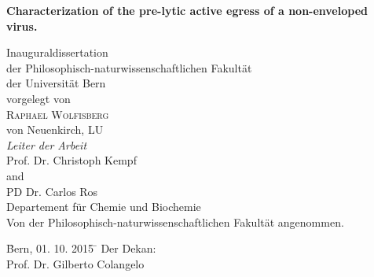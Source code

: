 \documentclass[11pt, titlepage, a4paper, twoside, onecolumn, DIV=calc]{scrbook} %
\begin{document}
\begin{titlepage}
\vspace{-1cm}
\begin{flushright}
\end{flushright}
\begin{center}
\begin{spacing}{2.5}
{\Huge \bfseries Characterization of the pre-lytic active egress of a non-enveloped virus.} \\[1 cm]
\end{spacing}
{\Large Inauguraldissertation \\
der Philosophisch-naturwissenschaftlichen Fakultät \\
der Universität Bern \\[1.3 cm]
{\large vorgelegt von}\\[0.3 cm]
{\LARGE \textsc{Raphael Wolfisberg}} \\[0.3 cm] 
{\large von Neuenkirch, LU} \\ [1.3 cm]
{\Large \emph{Leiter der Arbeit}\\ [0.3 cm]
{\textsc Prof. Dr. Christoph Kempf} \\
and \\
{\textsc PD Dr. Carlos Ros} \\ [0.9 cm]
Departement für Chemie und Biochemie} \\[0.8cm]
Von der Philosophisch-naturwissenschaftlichen Fakultät angenommen.} \\[1cm]
\end{center}
\begin{tabbing}

\= Bern, 01. 10. 2015 \= \hspace{5.5cm} Der Dekan: \\[1.5cm]
\> \> \hspace{5.5cm} Prof. Dr. Gilberto Colangelo
\end{tabbing}
\end{titlepage}










\cleardoublepage







\end{document}
